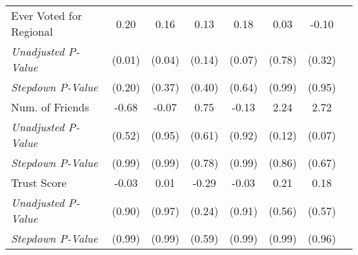 \begin{tabular}{l c c c c c c c}
Ever Voted for Regional & 0.20 & 0.16 & 0.13 & 0.18 & 0.03 & -0.10 \\
\quad \textit{Unadjusted P-Value} & (0.01) & (0.04) & (0.14) & (0.07) & (0.78) & (0.32) \\
\quad \textit{Stepdown P-Value} & (0.20) & (0.37) & (0.40) & (0.64) & (0.99) & (0.95) \\
Num. of Friends & -0.68 & -0.07 & 0.75 & -0.13 & 2.24 & 2.72 \\
\quad \textit{Unadjusted P-Value} & (0.52) & (0.95) & (0.61) & (0.92) & (0.12) & (0.07) \\
\quad \textit{Stepdown P-Value} & (0.99) & (0.99) & (0.78) & (0.99) & (0.86) & (0.67) \\
Trust Score & -0.03 & 0.01 & -0.29 & -0.03 & 0.21 & 0.18 \\
\quad \textit{Unadjusted P-Value} & (0.90) & (0.97) & (0.24) & (0.91) & (0.56) & (0.57) \\
\quad \textit{Stepdown P-Value} & (0.99) & (0.99) & (0.59) & (0.99) & (0.99) & (0.96) \\
\bottomrule
\end{tabular}
